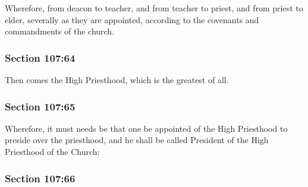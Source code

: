 		Wherefore, from deacon to teacher, and from teacher to priest, and from priest to elder, severally as they are appointed, according to the covenants and commandments of the church.


	\subsubsection{Section 107:64} %
		\label{DC107-64}

		Then comes the High Priesthood, which is the greatest of all.


	\subsubsection{Section 107:65} %
		\label{DC107-65}

		Wherefore, it must needs be that one be appointed of the High Priesthood to preside over the priesthood, and he shall be called President of the High Priesthood of the Church;


	\subsubsection{Section 107:66} %
		\label{DC107-66}

